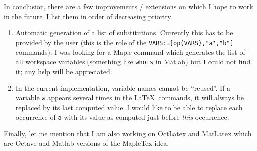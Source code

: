 \documentclass{article}
\begin{document}
 In conclusion, there are a few improvements / extensions on which I hope to work in the future. I list them 
 in order of decreasing priority. 
 \begin{enumerate}
 \item Automatic generation of a list of substitutions. Currently this has to be provided by the user
 (this is the role of the \texttt{VARS:=[op(VARS),"a","b"]} commands). I was looking for a \textsf{Maple} command 
 which generates the list of all workspace variables (something like \texttt{whois} in \textsf{Matlab})
 but I could not find it; any help will be appreciated.
 \item In the current implementation, variable names cannot be ``reused''. If a variable \texttt{a} appears several times
 in the \LaTeX\ commands, it will always be replaced by its last computed value. I would like to be able
 to replace each occurrence of \texttt{a} with its value as computed just before \emph{this} occurrence.
 \end{enumerate}
 \noindent Finally, let me mention that I am also working on \textsf{OctLatex} and \textsf{MatLatex} which are 
 \textsf{Octave} and \textsf{Matlab} versions of the \textsf{MapleTex} idea.

 
\end{document}
